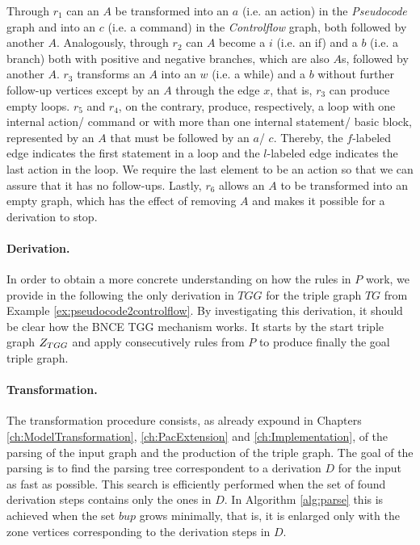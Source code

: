 Through $r_1$ can an $A$ be transformed into an $a$ (i.e. an action) in the \emph{Pseudocode} graph and into an $c$ (i.e. a command) in the \emph{Controlflow} graph, both followed by another $A$. Analogously, through $r_2$ can $A$ become a $i$ (i.e. an if) and a $b$ (i.e. a branch) both with positive and negative branches, which are also $A$s, followed by another $A$. $r_3$ transforms an $A$ into an $w$ (i.e. a while) and a $b$ without further follow-up vertices except by an $A$ through the edge $x$, that is, $r_3$ can produce empty loops. $r_5$ and $r_4$, on the contrary, produce, respectively, a loop with one internal action/ command or with more than one internal statement/ basic block, represented by an $A$ that must be followed by an $a$/ $c$. Thereby, the $f$-labeled edge indicates the first statement in a loop and the $l$-labeled edge indicates the last action in the loop. We require the last element to be an action so that we can assure that it has no follow-ups. Lastly, $r_6$ allows an $A$ to be transformed into an empty graph, which has the effect of removing $A$ and makes it possible for a derivation to stop.

\paragraph*{Derivation. } In order to obtain a more concrete understanding on how the rules in $P$ work, we provide in the following the only derivation in $TGG$ for the triple graph $TG$ from Example \ref{ex:pseudocode2controlflow}. By investigating this derivation, it should be clear how the BNCE TGG mechanism works. It starts by the start triple graph $Z_{TGG}$ and apply consecutively rules from $P$ to produce finally the goal triple graph.



\paragraph*{Transformation. } The transformation procedure consists, as already expound in Chapters \ref{ch:ModelTransformation}, \ref{ch:PacExtension} and \ref{ch:Implementation}, of the parsing of the input graph and the production of the triple graph. The goal of the parsing is to find the parsing tree correspondent to a derivation $D$ for the input as fast as possible. This search is efficiently performed when the set of found derivation steps contains only the ones in $D$. In Algorithm \ref{alg:parse} this is achieved when the set $bup$ grows minimally, that is, it is enlarged only with the zone vertices corresponding to the derivation steps in $D$.


